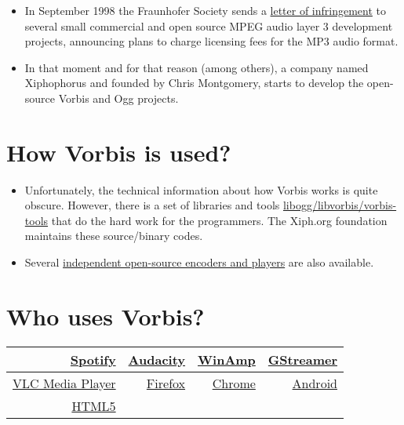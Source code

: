 \begin{itemize}
\item In September 1998 the Fraunhofer Society sends a \href{https://www.chillingeffects.org/patent/notice.cgi?NoticeID=464}{letter of
  infringement} to several small commercial and open source MPEG audio
  layer 3 development projects, announcing plans to charge licensing
  fees for the MP3 audio format.
\item In that moment and for that reason (among others), a company
  named Xiphophorus and founded by Chris Montgomery, starts to develop
  the open-source Vorbis and Ogg projects.
\end{itemize}


\section{How Vorbis is used?}

\begin{itemize}
\item Unfortunately, the technical information about how Vorbis works
  is quite obscure. However, there is a set of libraries and tools
  \href{http://www.vorbis.com/setup_linux/}{libogg/libvorbis/vorbis-tools}
  that do the hard work for the programmers. The Xiph.org foundation
  maintains these source/binary codes.
\item Several \href{http://www.vorbis.com/software/}{independent
  open-source encoders and players} are also available.
\end{itemize}


\section{Who uses Vorbis?}

\begin{center}
  \begin{tabular}{|r|r|r|r|}
    \hline
    \href{http://evolver.fm/2013/05/13/spotify-uses-different-audio-formats-depending-on-platform/}{Spotify} &
    \href{http://audacity.sourceforge.net/about/features}{Audacity} &
    \href{http://www.winamp.com/plugin/ogg-vorbis-encoder-v1-1/143936}{WinAmp} &
    \href{http://gstreamer.freedesktop.org/documentation/plugins.html}{GStreamer} \\
    \hline
    \href{http://www.fsf.org/campaigns/playogg/en/}{VLC Media Player} &
    \href{http://en.wikipedia.org/wiki/Use_of_Ogg_formats_in_HTML5}{Firefox} &
    \href{http://en.wikipedia.org/wiki/Use_of_Ogg_formats_in_HTML5}{Chrome} &
    \href{http://en.wikipedia.org/wiki/HTML5_video}{Android} \\
    \hline
    \href{http://www.w3.org/wiki/HTML/Elements/video}{HTML5} &
    &
    &
    \\
    \hline
  \end{tabular}
\end{center}


